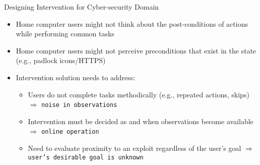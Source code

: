\begin{frame} {Designing Intervention for Cyber-security Domain}
\begin{itemize}
\item Home computer users might not think about the post-conditions of actions while performing common tasks
\item Home computer users might not perceive preconditions that exist in the state (e.g., padlock icons/HTTPS)

\item Intervention solution needs to address:
\begin{itemize}
\item Users do not complete tasks methodically (e.g., repeated actions, skips) $\Rightarrow$ \texttt{noise in observations}
\item Intervention must be decided as and when observations become available  $\Rightarrow$ \texttt{online operation}
\item Need to evaluate proximity to an exploit regardless of the user's goal $\Rightarrow$ \texttt{user's desirable goal is unknown}
\end{itemize}
\end{itemize}
\end{frame}